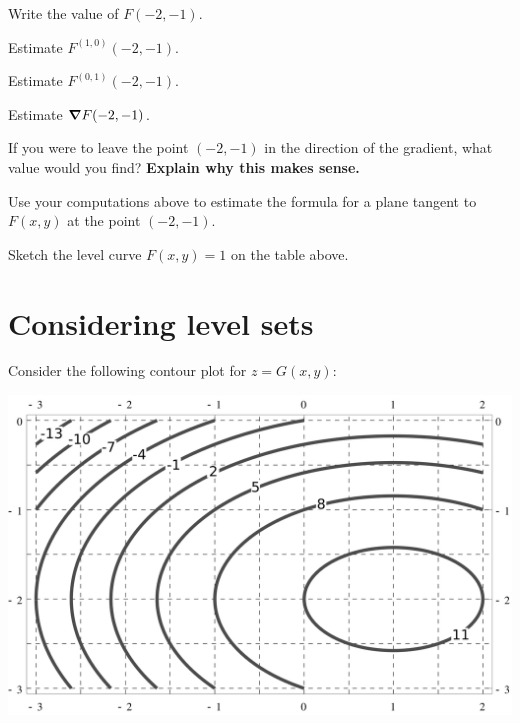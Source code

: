 \documentclass[handout,noauthor,nooutcomes]{ximera}
\begin{document}
\begin{problem}
  Write the value of $F(-2,-1)$.
\end{problem}


\begin{problem}
  Estimate $F^{(1,0)}(-2,-1)$.
\end{problem}

\begin{problem}
  Estimate $F^{(0,1)}(-2,-1)$.
\end{problem}

\begin{problem}
  Estimate $\boldsymbol\nabla F(-2,-1)$.
\end{problem}

\begin{problem}
  If you were to leave the point $(-2,-1)$ in the direction of the
  gradient, what value would you find? \textbf{Explain why this makes
    sense.}
\end{problem}


\begin{problem}
  Use your computations above to estimate the formula for a plane
  tangent to $F(x,y)$ at the point $(-2,-1)$.
\end{problem}

\begin{problem}
  Sketch the level curve $F(x,y) = 1$ on the table above.
\end{problem}

\section{Considering level sets}


Consider the following contour plot for $z=G(x,y)$:
\begin{image}[5in]
  \includegraphics{contours.png}
\end{image}
\end{document}
